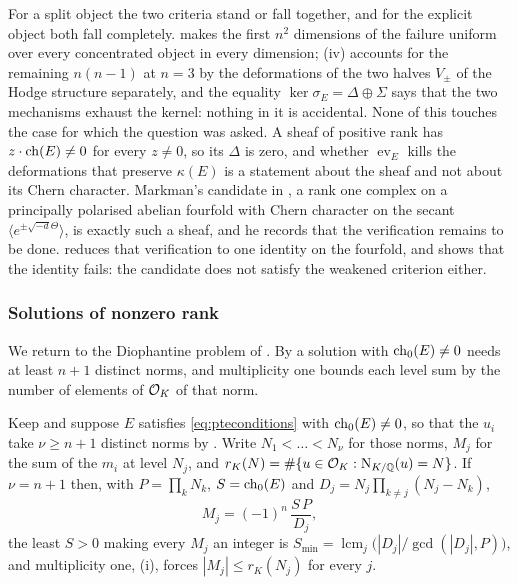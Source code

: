 \begin{remark}
\label{rem:question114}
For a split object the two criteria stand or fall together, and for the
explicit object both fall completely.  makes the first
$n^{2}$ dimensions of the failure uniform over every concentrated object in
every dimension; (iv) accounts for the remaining
$n(n-1)$ at $n=3$ by the deformations of the two halves $V_{\pm}$ of the
Hodge structure separately, and the equality $\ker\sigma_{E}=\Delta\oplus\Sigma$
says that the two mechanisms exhaust the kernel: nothing in it is
accidental. None of this touches the case for which the question was asked.
A sheaf of positive rank has $z\cdot\operatorname{ch}(E)\ne0$ for every $z\ne0$, so its
$\Delta$ is zero, and whether $\operatorname{ev}_{E}$ kills the deformations
that preserve $\kappa(E)$ is a statement about the sheaf and not about its
Chern character. Markman's candidate in \cite[Section 12]{Mar25b}, a rank
one complex on a principally polarised abelian fourfold with Chern character
on the secant $\langle e^{\pm\sqrt{-d}\Theta}\rangle$, is exactly such a
sheaf, and he records that the verification remains to be done.
 reduces that verification to one identity on the fourfold,
and  shows that the identity fails: the candidate
does not satisfy the weakened criterion either.
\end{remark}

\subsubsection*{Solutions of nonzero rank}

We return to the Diophantine problem of . By
 a solution with $\operatorname{ch}_{0}(E)\ne0$ needs at least $n+1$
distinct norms, and multiplicity one bounds each level sum by the number of
elements of $\mathcal{O}_{K}$ of that norm.

\begin{proposition}\label{thm:pterange}
Keep  and suppose $E$ satisfies \eqref{eq:pteconditions} with
$\operatorname{ch}_{0}(E)\ne0$, so that the $u_{i}$ take $\nu\ge n+1$ distinct norms by
. Write $N_{1}<\dots<N_{\nu}$ for those norms, $M_{j}$ for
the sum of the $m_{i}$ at level $N_{j}$, and
$r_{K}(N)=\#\{u\in\mathcal{O}_{K}:\mathrm{N}_{K/\mathbb{Q}}(u)=N\}$. If $\nu=n+1$ then, with
$P=\prod_{k}N_{k}$, $S=\operatorname{ch}_{0}(E)$ and
$D_{j}=N_{j}\prod_{k\ne j}(N_{j}-N_{k})$,
\begin{equation}\label{eq:levelsums}
  M_{j}=(-1)^{n}\,\frac{S\,P}{D_{j}},
\end{equation}
the least $S>0$ making every $M_{j}$ an integer is
$S_{\min}=\operatorname{lcm}_{j}\bigl(|D_{j}|/\gcd(|D_{j}|,P)\bigr)$, and
multiplicity one, (i), forces
$|M_{j}|\le r_{K}(N_{j})$ for every $j$.
\end{proposition}

